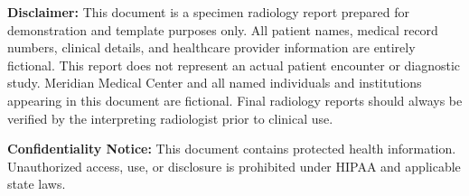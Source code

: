 \vspace{10pt}

\begin{tcolorbox}[
  colback=primaryblue!4,
  colframe=primaryblue!20,
  boxrule=0.4pt,
  arc=3pt,
  left=10pt,
  right=10pt,
  top=8pt,
  bottom=8pt,
  fontupper=\footnotesize\color{primaryblue!70}
]
  \textbf{Disclaimer:} This document is a specimen radiology report prepared for demonstration and template purposes only. All patient names, medical record numbers, clinical details, and healthcare provider information are entirely fictional. This report does not represent an actual patient encounter or diagnostic study. Meridian Medical Center and all named individuals and institutions appearing in this document are fictional. Final radiology reports should always be verified by the interpreting radiologist prior to clinical use.

  \textbf{Confidentiality Notice:} This document contains protected health information. Unauthorized access, use, or disclosure is prohibited under HIPAA and applicable state laws.
\end{tcolorbox}
